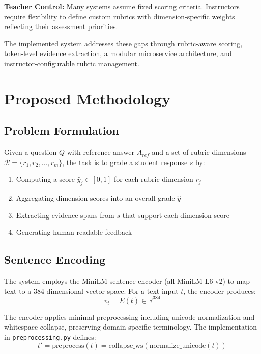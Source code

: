 \documentclass[conference]{IEEEtran}
\begin{document}
\textbf{Teacher Control:} Many systems assume fixed scoring criteria. Instructors require flexibility to define custom rubrics with dimension-specific weights reflecting their assessment priorities.

The implemented system addresses these gaps through rubric-aware scoring, token-level evidence extraction, a modular microservice architecture, and instructor-configurable rubric management.

\section{Proposed Methodology}

\subsection{Problem Formulation}
Given a question $Q$ with reference answer $A_{ref}$ and a set of rubric dimensions $\mathcal{R} = \{r_1, r_2, \ldots, r_m\}$, the task is to grade a student response $s$ by:
\begin{enumerate}
    \item Computing a score $\hat{y}_j \in [0, 1]$ for each rubric dimension $r_j$
    \item Aggregating dimension scores into an overall grade $\hat{y}$
    \item Extracting evidence spans from $s$ that support each dimension score
    \item Generating human-readable feedback
\end{enumerate}

\subsection{Sentence Encoding}
The system employs the MiniLM sentence encoder (all-MiniLM-L6-v2) to map text to a 384-dimensional vector space. For a text input $t$, the encoder produces:
\begin{equation}
    v_t = E(t) \in \mathbb{R}^{384}
\end{equation}

The encoder applies minimal preprocessing including unicode normalization and whitespace collapse, preserving domain-specific terminology. The implementation in \texttt{preprocessing.py} defines:
\begin{equation}
    t' = \text{preprocess}(t) = \text{collapse\_ws}(\text{normalize\_unicode}(t))
\end{equation}
\end{document}
